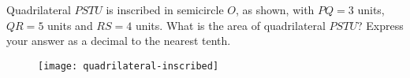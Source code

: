 Quadrilateral $PSTU$ is inscribed in semicircle $O$, as shown, with $PQ=3$ units, $QR=5$ units and $RS=4$ units. What is the area of quadrilateral $PSTU$? Express your answer as a decimal to the nearest tenth. 

\begin{figure}[H]
\centering
\texttt{[image: quadrilateral-inscribed]}
\end{figure}
